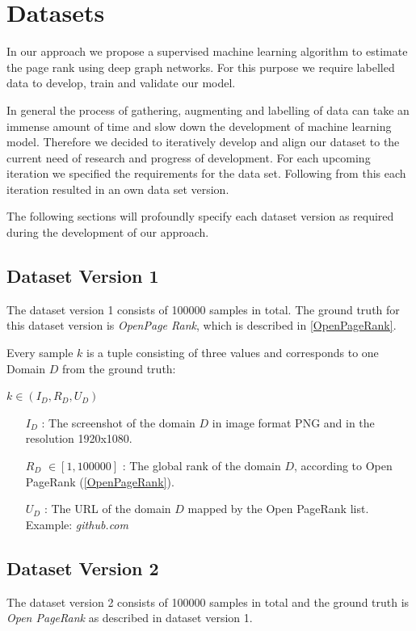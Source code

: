 
\section{Datasets}
In our approach we propose a supervised machine learning algorithm to estimate the page rank using deep graph networks. For this purpose we require labelled data to develop, train and validate our model. 

In general the process of gathering, augmenting and labelling of data can take an immense amount of time and slow down the development of machine learning model. Therefore we decided to iteratively develop and align our dataset to the current need of research and progress of development. For each upcoming iteration we specified the requirements for the data set. Following from this each iteration resulted in an own data set version.

The following sections will profoundly specify each dataset version as required during the development of our approach.

\subsection{Dataset Version 1}
\label{DatasetVersion1}
The dataset version 1 consists of 100000 samples in total. The ground truth for this dataset version is \textit{OpenPage Rank}, which is described in \ref{OpenPageRank}.

Every sample $k$ is a tuple consisting of three values and corresponds to one Domain $D$ from the ground truth:

\begin{center}
 $ k \in (I_D, R_D, U_D)$
\begin{itemize}
	\item[$I_D$]: The screenshot of the domain $D$ in image format PNG and in the resolution 1920x1080.
	\item[$R_D$] $\in [1, 100000]$ : The global rank of the domain $D$, according to Open PageRank (\ref{OpenPageRank}). 
	\item[$U_D$]: The URL of the domain $D$ mapped by the Open PageRank list. Example: \textit{github.com}
\end{itemize}
\end{center}

\subsection{Dataset Version 2}
\label{DatasetVersion2}
The dataset version 2 consists of 100000 samples in total and the ground truth is \textit{Open PageRank} as described in dataset version 1.

